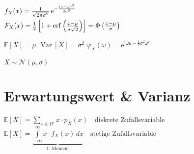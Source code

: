 \documentclass[8pt,a4paper,landscape]{extarticle}
\begin{document}
\begin{multicols*}{6}
\vspace{2pt}

\vspace{10pt}
\begin{varwidth}{\dimexpr{}\fboxsep\relax}
  \ensuremath{
    \begin{array}{lll}
      \hspace*{-5pt}
      f_X(x) = \frac{1}{\sqrt{2\pi\sigma^2}} \, \mathrm{e}^{-\frac{(x-\mu)^2}{2\sigma^2}} \\[6pt]
      \hspace*{-5pt}
      F_X(x) = \frac{1}{2} \left[ 1 + \operatorname{erf}\left( \frac{x-\mu}{\sigma\sqrt{2}} \right) \right] = \Phi\left(\frac{x-\mu}{\sigma}\right)
    \end{array}
  }
\end{varwidth}
\vspace{10pt}

\vspace{22pt}

\vspace{10pt}
\fsubcols
{\CheatsheetItemListStart
{}
\CheatsheetItemListEnd
$\mathbb{E}[X] = \mu$
}
{
\CheatsheetItemListStart
{}
\CheatsheetItemListEnd
$\operatorname{Var}[X] = \sigma^2$
}
\vspace{4pt}
\CheatsheetItemListStart
{}
\CheatsheetItemListEnd
$\varphi_X(\omega) = \mathrm{e}^{\mathrm{j}\omega\mu - \frac{1}{2}\sigma^2\omega^2}$

\CheatsheetItemListStart
{}
\CheatsheetItemListEnd
$X \sim \mathcal{N}(\mu, \sigma)$










\section{Erwartungswert \& Varianz}


      $\mathbb{E}[X] = \sum_{x \in \Omega'} x \cdot p_X(x) \quad \text{diskrete Zufallsvariable}$ \\[8pt]
      $\mathbb{E}[X] = \underbrace{\int\limits_{-\infty}^{\infty} x \cdot f_X(x) \, dx}_{\text{1. Moment}} \quad \text{stetige Zufallsvariable}$
\vspace{15pt}


\end{multicols*}
\end{document}
